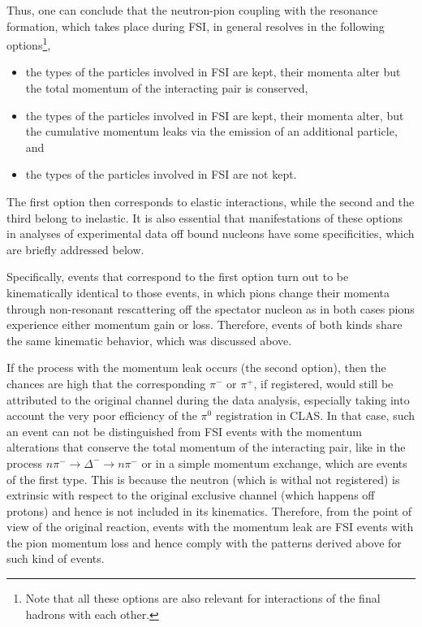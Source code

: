 Thus, one can conclude that the neutron-pion coupling with the resonance formation, which takes place during FSI, in general resolves in the following options\footnote[10]{Note that all these options are also relevant for interactions of the final hadrons with each other.},\vspace{-0.25em}
\begin{itemize}
\item the types of the particles involved in FSI are kept, their momenta alter but the total momentum of the interacting pair is conserved,
\item the types of the particles involved in FSI are kept, their momenta alter, but the cumulative momentum leaks via the emission of an additional particle, and 
\item the types of the particles involved in FSI are not kept.
\end{itemize}

The first option then corresponds to elastic interactions, while the second and the third belong to inelastic. It is also essential that manifestations of these options in analyses of experimental data off bound nucleons have some specificities, which are briefly addressed below.


Specifically, events that correspond to the first option turn out to be kinematically identical to those events, in which pions change their momenta through non-resonant rescattering off the spectator nucleon as in both cases pions experience either momentum gain or loss. Therefore, events of both kinds share the same kinematic behavior, which was discussed above.


If the process with the momentum leak occurs (the second option), then the chances are high that the corresponding $\pi^{-}$ or $\pi^{+}$, if registered, would still be attributed to the original channel during the data analysis, especially taking into account the very poor efficiency of the $\pi^{0}$ registration in CLAS. In that case, such an event can not be distinguished from FSI events with the momentum alterations that conserve the total momentum of the interacting pair, like in the process $n\pi^{-}\rightarrow \Delta^{-}\rightarrow n\pi^{-}$ or in a simple momentum exchange, which are events of the first type. This is because the neutron (which is withal not registered) is extrinsic with respect to the original exclusive channel (which happens off protons) and hence is not included in its kinematics. Therefore, from the point of view of the original reaction, events with the momentum leak are FSI events with the pion momentum loss and hence comply with the patterns derived above for such kind of events.


